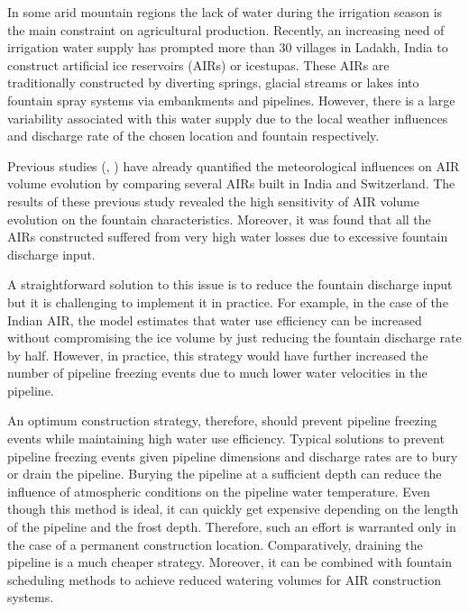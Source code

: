\documentclass[tc, manuscript]{copernicus}
\begin{document}
\introduction

In some arid mountain regions the lack of water during the irrigation season is the main constraint on
agricultural production. Recently, an increasing need of irrigation water supply has prompted more than 30
villages in Ladakh, India to construct artificial ice reservoirs (AIRs) or icestupas. These AIRs are
traditionally constructed by diverting springs, glacial streams or lakes into fountain spray systems via
embankments and pipelines. However, there is a large variability associated with this water supply due to the
local weather influences and discharge rate of the chosen location and fountain respectively. 

Previous studies (\citep{balasubramanianInfluenceMeteorologicalConditions2022},
\citep{oerlemansBriefCommunicationGrowth2021}) have already quantified the meteorological influences on AIR
volume evolution by comparing several AIRs built in India and Switzerland. The results of these previous study
revealed the high sensitivity of AIR volume evolution on the fountain characteristics. Moreover, it was found
that all the AIRs constructed suffered from very high water losses due to excessive fountain discharge input. 

A straightforward solution to this issue is to reduce the fountain discharge input but it is challenging to
implement it in practice. For example, in the case of the Indian AIR, the model estimates that water use
efficiency can be increased without compromising the ice volume by just reducing the fountain discharge rate by
half. However, in practice, this strategy would have further increased the number of pipeline freezing events
due to much lower water velocities in the pipeline. 

An optimum construction strategy, therefore, should prevent pipeline freezing events while maintaining high
water use efficiency. Typical solutions to prevent pipeline freezing events given pipeline dimensions and
discharge rates are to bury or drain the pipeline. Burying the pipeline at a sufficient depth can reduce the
influence of atmospheric conditions on the pipeline water temperature. Even though this method is ideal, it can
quickly get expensive depending on the length of the pipeline and the frost depth. Therefore, such an effort is
warranted only in the case of a permanent construction location. Comparatively, draining the pipeline is a much
cheaper strategy. Moreover, it can be combined with fountain scheduling methods to achieve reduced watering
volumes for AIR construction systems.
\end{document}
